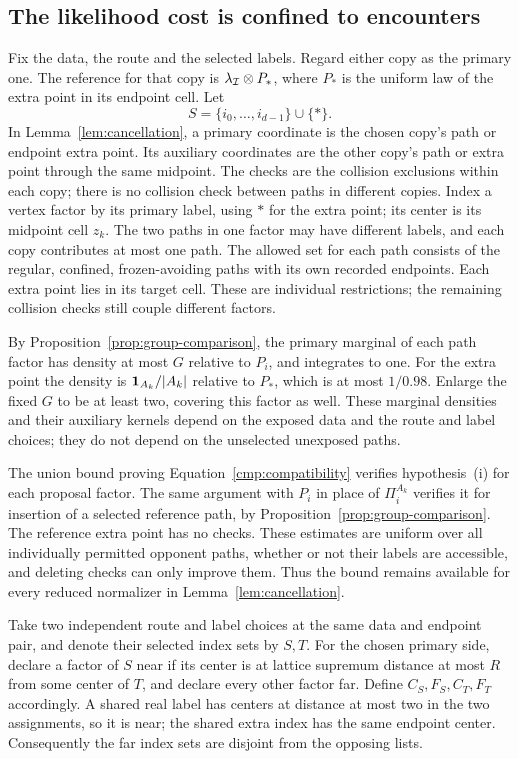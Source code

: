 \subsection{The likelihood cost is confined to encounters}

Fix the data, the route and the selected labels. Regard either copy as the
primary one. The reference for that copy is
$\lambda_{\mathcal I}\otimes P_*$, where $P_*$ is the uniform law of the extra
point in its endpoint cell. Let
\[
 S=\{i_0,\ldots,i_{d-1}\}\cup\{*\}.
\]
In Lemma~\ref{lem:cancellation}, a primary coordinate is the chosen copy's
path or endpoint extra point. Its auxiliary coordinates are the other
copy's path or extra point through the same midpoint. The checks are the
collision exclusions within each copy; there is no collision check between
paths in different copies.
Index a vertex factor by its primary label, using $*$ for the extra point;
its center is its midpoint cell $z_k$. The two paths in one factor may have
different labels, and each copy contributes at most one path. The allowed
set for each path consists of the regular, confined, frozen-avoiding paths
with its own recorded endpoints. Each extra point lies in its target cell.
These are individual restrictions; the remaining collision checks still
couple different factors.

By Proposition~\ref{prop:group-comparison}, the primary marginal of each path
factor has density at most $G$ relative to $P_i$, and integrates to one.
For the extra point the density is $\mathbf 1_{A_k}/|A_k|$ relative to $P_*$,
which is at most $1/0.98$. Enlarge the fixed $G$ to be at least two, covering
this factor as well. These marginal densities and their auxiliary kernels
depend on the exposed data and the route and label choices; they do not
depend on the unselected unexposed paths.

The union bound proving Equation~\eqref{cmp:compatibility} verifies
hypothesis~\textup{(i)} for each proposal factor. The same argument with
$P_i$ in place of $\Pi_i^{A_k}$ verifies it for insertion of a selected
reference path, by Proposition~\ref{prop:group-comparison}. The reference extra
point has no checks. These estimates are uniform over all individually
permitted opponent paths, whether or not their labels are accessible, and
deleting checks can only improve them. Thus the bound remains available
for every reduced normalizer in Lemma~\ref{lem:cancellation}.

Take two independent route and label choices at the same data and endpoint
pair, and denote their selected index sets by $S,T$. For the chosen primary
side, declare a factor of $S$ near if its center is at lattice supremum
distance at most $R$ from some center of $T$, and declare every other factor
far. Define $C_S,F_S,C_T,F_T$ accordingly. A shared real label has centers
at distance at most two in the two assignments, so it is near; the shared
extra index has the same endpoint center. Consequently the far index sets
are disjoint from the opposing lists.

